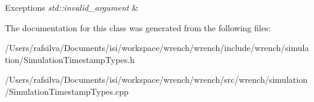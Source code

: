 \begin{DoxyExceptions}{Exceptions}
{\em std\+::invalid\+\_\+argument} & \\
\hline
\end{DoxyExceptions}


The documentation for this class was generated from the following files\+:\begin{DoxyCompactItemize}
\item 
/\+Users/rafsilva/\+Documents/isi/workspace/wrench/wrench/include/wrench/simulation/Simulation\+Timestamp\+Types.\+h\item 
/\+Users/rafsilva/\+Documents/isi/workspace/wrench/wrench/src/wrench/simulation/Simulation\+Timestamp\+Types.\+cpp\end{DoxyCompactItemize}
